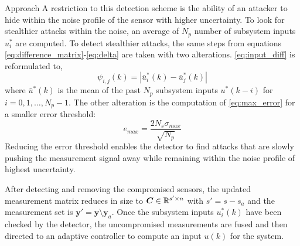 \begin{section}{Approach}
A restriction to this detection scheme is the ability of an attacker to hide within the noise profile of the sensor with higher uncertainty. To look for stealthier attacks within the noise, an average of $N_p$ number of subsystem inputs $u^*_i$ are computed. To detect stealthier attacks, the same steps from equations \eqref{eq:difference_matrix}-\eqref{eq:delta} are taken with two alterations. \eqref{eq:input_diff} is reformulated to,
    \begin{equation}
        \label{eq:input_diff2}
        \psi_{i,j}(k)=|\bar{u}^*_i(k)-\bar{u}^*_j(k)|
    \end{equation}
where $\bar{u}^*(k)$ is the mean of the past $N_p$ subsystem inputs $u^*(k-i)$ for $i=0,1,\dots,N_p-1$. The other alteration is the computation of \eqref{eq:max_error} for a smaller error threshold:
    \begin{equation}
	    \label{eq:max_error2}
	    e_{max} = \frac{2N_s\sigma_{max}}{\sqrt{N_p}}
	\end{equation}
Reducing the error threshold enables the detector to find attacks that are slowly pushing the measurement signal away while remaining within the noise profile of highest uncertainty.

After detecting and removing the compromised sensors, the updated measurement matrix reduces in size to $\bm{C} \in \mathbb{R}^{s' \times n}$ with $s'=s-s_a$ and the measurement set is $\bm{y}' =\bm{y}\setminus\bm{y}_a$. Once the subsystem inputs $u_i^*(k)$ have been checked by the detector, the uncompromised measurements are fused and then directed to an adaptive controller to compute an input $u(k)$ for the system.


	


\end{section}
